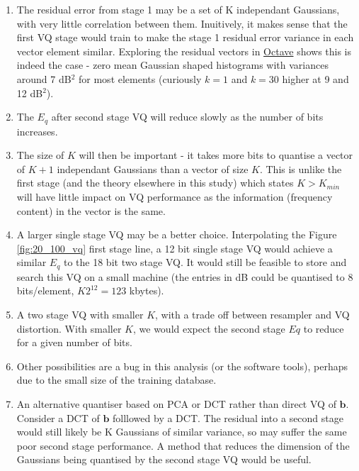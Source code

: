 \documentclass{article}
\begin{document}
\begin{enumerate}

\item The residual error from stage 1 may be a set of K independant Gaussians, with very little correlation between them.  Inuitively, it makes sense that the first VQ stage would train to make the stage 1 residual error variance in each vector element similar.  Exploring the residual vectors in \url{Octave} shows this is indeed the case - zero mean Gaussian shaped histograms with variances around 7 dB$^2$ for most elements (curiously $k=1$ and $k=30$ higher at 9 and 12 dB$^2$).

\item The $E_q$ after second stage VQ will reduce slowly as the number of bits increases.  

\item The size of $K$ will then be important - it takes more bits to quantise a vector of $K+1$ independant Gaussians than a vector of size $K$.  This is unlike the first stage (and the theory elsewhere in this study) which states $K>K_{min}$ will have little impact on VQ performance as the information (frequency content) in the vector is the same.
 
\item A larger single stage VQ may be a better choice.  Interpolating the Figure \ref{fig:20_100_vq} first stage line, a 12 bit single stage VQ would achieve a similar $E_q$ to the 18 bit two stage VQ.  It would still be feasible to store and search this VQ on a small machine (the entries in dB could be quantised to 8 bits/element, $K2^{12}=123$ kbytes).

\item A two stage VQ with smaller $K$, with a trade off between resampler and VQ distortion.  With smaller $K$, we would expect the second stage $Eq$ to reduce for a given number of bits.

\item Other possibilities are a bug in this analysis (or the software tools), perhaps due to the small size of the training database. 

\item An alternative quantiser based on PCA or DCT rather than direct VQ of $\mathbf{b}$.  Consider a DCT of $\mathbf{b}$ folllowed by a DCT. The residual into a second stage would still likely be K Gaussians of similar variance, so may suffer the same poor second stage performance.  A method that reduces the dimension of the Gaussians being quantised by the second stage VQ would be useful.

\end{enumerate}
\end{document}
